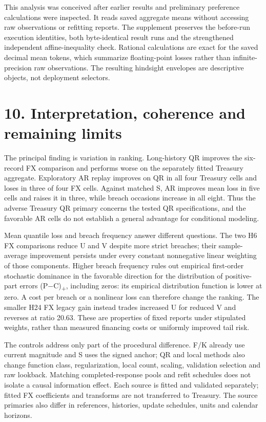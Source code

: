 \documentclass[10pt,a4paper]{article}
\begin{document}
This analysis was conceived after earlier results and preliminary preference calculations were inspected. It reads saved aggregate means without accessing raw observations or refitting reports. The supplement preserves the before-run execution identities, both byte-identical result runs and the strengthened independent affine-inequality check. Rational calculations are exact for the saved decimal mean tokens, which summarize floating-point losses rather than infinite-precision raw observations. The resulting hindsight envelopes are descriptive objects, not deployment selectors.

\section*{10. Interpretation, coherence and remaining limits}
The principal finding is variation in ranking. Long-history QR improves the six-record FX comparison and performs worse on the separately fitted Treasury aggregate. Exploratory AR replay improves on QR in all four Treasury cells and loses in three of four FX cells. Against matched S, AR improves mean loss in five cells and raises it in three, while breach occasions increase in all eight. Thus the adverse Treasury QR primary concerns the tested QR specifications, and the favorable AR cells do not establish a general advantage for conditional modeling.

Mean quantile loss and breach frequency answer different questions. The two H6 FX comparisons reduce U and V despite more strict breaches; their sample-average improvement persists under every constant nonnegative linear weighting of those components. Higher breach frequency rules out empirical first-order stochastic dominance in the favorable direction for the distribution of positive-part errors (P\(-\)C)\textsubscript{+}, including zeros: its empirical distribution function is lower at zero. A cost per breach or a nonlinear loss can therefore change the ranking. The smaller H24 FX legacy gain instead trades increased U for reduced V and reverses at ratio 20.63. These are properties of fixed reports under stipulated weights, rather than measured financing costs or uniformly improved tail risk.

The controls address only part of the procedural difference. F/K already use current magnitude and S uses the signed anchor; QR and local methods also change function class, regularization, local count, scaling, validation selection and raw lookback. Matching completed-response pools and refit schedules does not isolate a causal information effect. Each source is fitted and validated separately; fitted FX coefficients and transforms are not transferred to Treasury. The source primaries also differ in references, histories, update schedules, units and calendar horizons.
\end{document}
